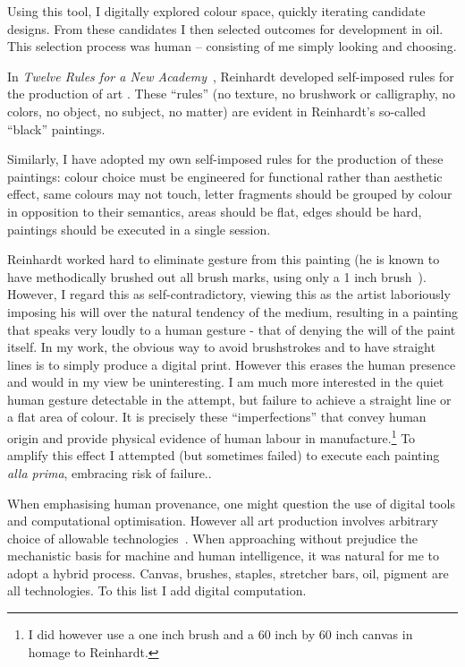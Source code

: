 \documentclass[12pt]{article}
\begin{document}
Using this tool, I digitally explored colour space, quickly iterating candidate designs. From these candidates I then selected outcomes for development in oil. This selection process was human -- consisting of me simply looking and choosing.

In \emph{Twelve Rules for a New Academy}~\cite[p. 203-7]{artasart}, Reinhardt developed self-imposed rules for the production of art . These ``rules'' (no texture, no brushwork or calligraphy, no colors, no object, no subject, no matter) are evident in Reinhardt's so-called ``black'' paintings. 

Similarly, I have adopted my own self-imposed rules for the production of these paintings:
colour choice must be engineered for functional rather than aesthetic effect, same colours may not touch, letter fragments should be grouped by colour in opposition to their semantics, areas should be flat, edges should be hard, paintings should be executed in a single session.

Reinhardt worked hard to eliminate gesture from this painting (he is known to have methodically brushed out all brush marks, using only a 1 inch brush~\cite[p. 206]{artasart}). However, I regard this as self-contradictory, viewing this as the artist laboriously imposing his will over the natural tendency of the medium, resulting in a painting that speaks very loudly to a human gesture - that of denying the will of the paint itself. In my work, the obvious way to avoid brushstrokes and to have straight lines is to simply produce a digital print. However this erases the human presence and would in my view be uninteresting. I am much more interested in the quiet human gesture detectable in the attempt, but failure to achieve a straight line or a flat area of colour. It is precisely these ``imperfections'' that convey human origin and provide physical evidence of human labour in manufacture.\footnote{I did however use a one inch brush and a 60 inch by 60 inch canvas in homage to Reinhardt.} To amplify this effect I attempted (but sometimes failed) to execute each painting \emph{alla prima}, embracing risk of failure.\cite{rosenberg1952american,moholy1947vision,bois1990painting}.

When emphasising human provenance, one might question the use of digital tools and computational optimisation. However all art production involves arbitrary choice of allowable technologies~\cite{huizinga1938homo,kubler1962shape,flusser2000towards,manovich2001language,steyerl2009poorimage,perec1969disparition}.  When approaching without prejudice the mechanistic basis for machine and human intelligence, it was natural for me to adopt a hybrid process.  Canvas, brushes, staples, stretcher bars, oil, pigment are all technologies. To this list I add digital computation.
\end{document}
